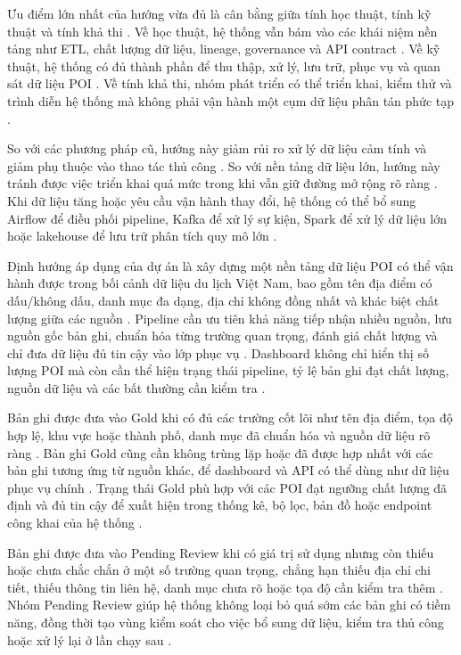 Ưu điểm lớn nhất của hướng vừa đủ là cân bằng giữa tính học thuật, tính kỹ thuật và tính khả thi \cite{ibmWarehouseLake}. Về học thuật, hệ thống vẫn bám vào các khái niệm nền tảng như ETL, chất lượng dữ liệu, lineage, governance và API contract \cite{damaDmbok}. Về kỹ thuật, hệ thống có đủ thành phần để thu thập, xử lý, lưu trữ, phục vụ và quan sát dữ liệu POI \cite{ibmETL}. Về tính khả thi, nhóm phát triển có thể triển khai, kiểm thử và trình diễn hệ thống mà không phải vận hành một cụm dữ liệu phân tán phức tạp \cite{dockerCompose}.\par

So với các phương pháp cũ, hướng này giảm rủi ro xử lý dữ liệu cảm tính và giảm phụ thuộc vào thao tác thủ công \cite{ibmDataQuality}. So với nền tảng dữ liệu lớn, hướng này tránh được việc triển khai quá mức trong khi vẫn giữ đường mở rộng rõ ràng \cite{armbrust2021}. Khi dữ liệu tăng hoặc yêu cầu vận hành thay đổi, hệ thống có thể bổ sung Airflow để điều phối pipeline, Kafka để xử lý sự kiện, Spark để xử lý dữ liệu lớn hoặc lakehouse để lưu trữ phân tích quy mô lớn \cite{airflowDocs}.\par


Định hướng áp dụng của dự án là xây dựng một nền tảng dữ liệu POI có thể vận hành được trong bối cảnh dữ liệu du lịch Việt Nam, bao gồm tên địa điểm có dấu/không dấu, danh mục đa dạng, địa chỉ không đồng nhất và khác biệt chất lượng giữa các nguồn \cite{yeboah2021}. Pipeline cần ưu tiên khả năng tiếp nhận nhiều nguồn, lưu nguồn gốc bản ghi, chuẩn hóa từng trường quan trọng, đánh giá chất lượng và chỉ đưa dữ liệu đủ tin cậy vào lớp phục vụ \cite{ibmDataQuality}. Dashboard không chỉ hiển thị số lượng POI mà còn cần thể hiện trạng thái pipeline, tỷ lệ bản ghi đạt chất lượng, nguồn dữ liệu và các bất thường cần kiểm tra \cite{tableauKpi}.\par


Bản ghi được đưa vào Gold khi có đủ các trường cốt lõi như tên địa điểm, tọa độ hợp lệ, khu vực hoặc thành phố, danh mục đã chuẩn hóa và nguồn dữ liệu rõ ràng \cite{ibmDataQuality}. Bản ghi Gold cũng cần không trùng lặp hoặc đã được hợp nhất với các bản ghi tương ứng từ nguồn khác, để dashboard và API có thể dùng như dữ liệu phục vụ chính \cite{ibmLineage}. Trạng thái Gold phù hợp với các POI đạt ngưỡng chất lượng đã định và đủ tin cậy để xuất hiện trong thống kê, bộ lọc, bản đồ hoặc endpoint công khai của hệ thống \cite{tableauKpi}.\par

Bản ghi được đưa vào Pending Review khi có giá trị sử dụng nhưng còn thiếu hoặc chưa chắc chắn ở một số trường quan trọng, chẳng hạn thiếu địa chỉ chi tiết, thiếu thông tin liên hệ, danh mục chưa rõ hoặc tọa độ cần kiểm tra thêm \cite{ibmDataQuality}. Nhóm Pending Review giúp hệ thống không loại bỏ quá sớm các bản ghi có tiềm năng, đồng thời tạo vùng kiểm soát cho việc bổ sung dữ liệu, kiểm tra thủ công hoặc xử lý lại ở lần chạy sau \cite{ibmLineage}.\par

